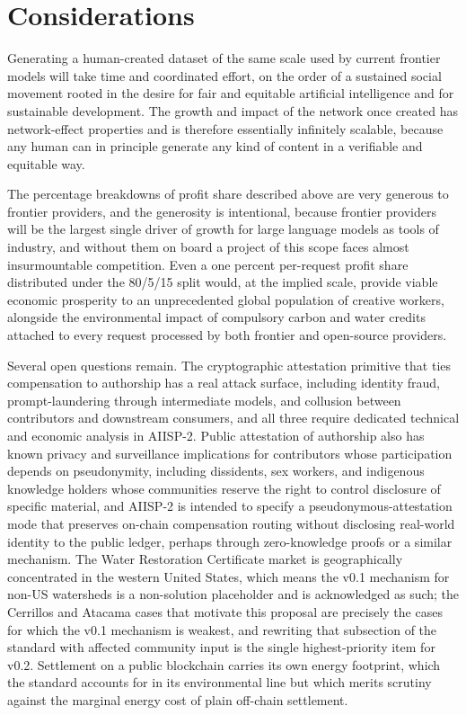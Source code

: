 \documentclass[10pt,a4paper,twocolumn]{article}
\begin{document}
\section{Considerations}
\label{sec:considerations}

Generating a human-created dataset of the same scale used by current frontier models will take time and coordinated effort, on the order of a sustained social movement rooted in the desire for fair and equitable artificial intelligence and for sustainable development. The growth and impact of the network once created has network-effect properties and is therefore essentially infinitely scalable, because any human can in principle generate any kind of content in a verifiable and equitable way.

The percentage breakdowns of profit share described above are very generous to frontier providers, and the generosity is intentional, because frontier providers will be the largest single driver of growth for large language models as tools of industry, and without them on board a project of this scope faces almost insurmountable competition. Even a one percent per-request profit share distributed under the 80/5/15 split would, at the implied scale, provide viable economic prosperity to an unprecedented global population of creative workers, alongside the environmental impact of compulsory carbon and water credits attached to every request processed by both frontier and open-source providers.

Several open questions remain. The cryptographic attestation primitive that ties compensation to authorship has a real attack surface, including identity fraud, prompt-laundering through intermediate models, and collusion between contributors and downstream consumers, and all three require dedicated technical and economic analysis in AIISP-2. Public attestation of authorship also has known privacy and surveillance implications for contributors whose participation depends on pseudonymity, including dissidents, sex workers, and indigenous knowledge holders whose communities reserve the right to control disclosure of specific material, and AIISP-2 is intended to specify a pseudonymous-attestation mode that preserves on-chain compensation routing without disclosing real-world identity to the public ledger, perhaps through zero-knowledge proofs or a similar mechanism. The Water Restoration Certificate market is geographically concentrated in the western United States, which means the v0.1 mechanism for non-US watersheds is a non-solution placeholder and is acknowledged as such; the Cerrillos and Atacama cases that motivate this proposal are precisely the cases for which the v0.1 mechanism is weakest, and rewriting that subsection of the standard with affected community input is the single highest-priority item for v0.2. Settlement on a public blockchain carries its own energy footprint, which the standard accounts for in its environmental line but which merits scrutiny against the marginal energy cost of plain off-chain settlement.
\end{document}
